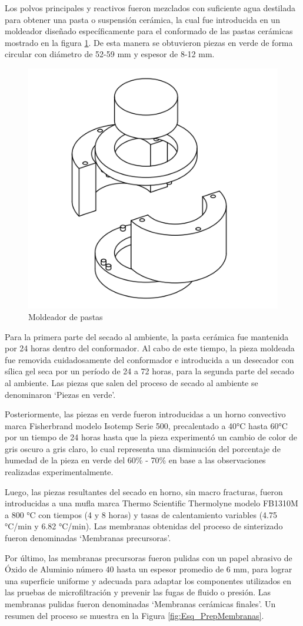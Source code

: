 \documentclass{article}
\begin{document}
Los polvos principales y reactivos fueron mezclados con suficiente 
agua destilada para obtener una pasta o suspensión cerámica, la cual 
fue introducida en un moldeador diseñado específicamente para el 
conformado de las pastas cerámicas mostrado en la 
figura \ref{fig:Moldeador_Pastas}. De esta manera se obtuvieron piezas 
en verde de forma circular con diámetro de 52-59 mm y 
espesor de 8-12 mm. 

\begin{figure}[!htbp]
    \centering
    \includegraphics[width=0.4\linewidth]{Graphics/Moldeador ZTMY-01.png}
    \caption{Moldeador de pastas}
    \label{fig:Moldeador_Pastas}
\end{figure}

Para la primera parte del secado al ambiente, la pasta cerámica fue 
mantenida por 24 horas dentro del conformador. 
Al cabo de este tiempo, la pieza moldeada fue removida 
cuidadosamente del conformador e introducida a un desecador con 
sílica gel seca por un período de 24 a 72 horas, para la segunda 
parte del secado al ambiente. Las piezas que salen del proceso de 
secado al ambiente se denominaron ‘Piezas en verde’.

Posteriormente, las piezas en verde fueron introducidas a un horno 
convectivo marca Fisherbrand modelo Isotemp Serie 500, 
precalentado a 40°C hasta 60°C por un tiempo de 24 horas hasta 
que la pieza experimentó un cambio de color de gris oscuro a gris 
claro, lo cual representa una disminución del porcentaje de humedad 
de la pieza en verde del 60\% - 70\% en base a las observaciones 
realizadas experimentalmente. 

Luego, las piezas resultantes del secado en horno, 
sin macro fracturas, fueron introducidas a una mufla marca 
Thermo Scientific Thermolyne modelo FB1310M a 800 °C con 
tiempos (4 y 8 horas) y tasas de calentamiento variables 
(4.75 °C/min y 6.82 °C/min). Las membranas obtenidas del proceso de 
sinterizado fueron denominadas ‘Membranas precursoras’.

Por último, las membranas precursoras fueron pulidas con un papel 
abrasivo de Óxido de Aluminio número 40 hasta un espesor promedio 
de 6 mm, para lograr una superficie uniforme y adecuada para adaptar 
los componentes utilizados en las pruebas de microfiltración y 
prevenir las fugas de fluido o presión. Las membranas pulidas fueron 
denominadas ‘Membranas cerámicas finales’. Un resumen del proceso se 
muestra en la Figura \ref{fig:Esq_PrepMembranas}.
\end{document}

